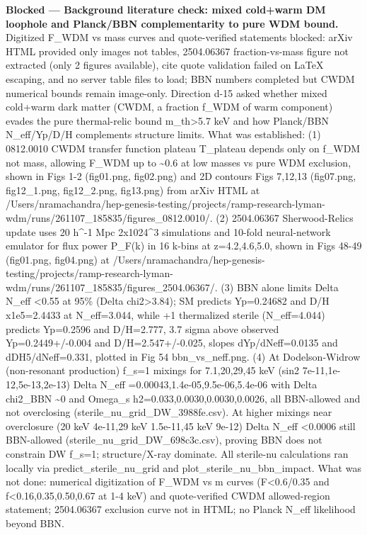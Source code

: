 \documentclass[11pt,a4paper]{article}
\begin{document}
\textbf{Blocked --- Background literature check: mixed cold+warm DM loophole and Planck/BBN complementarity to pure WDM bound.} Digitized F\_WDM vs mass curves and quote-verified statements blocked: arXiv HTML provided only images not tables, 2504.06367 fraction-vs-mass figure not extracted (only 2 figures available), cite quote validation failed on LaTeX escaping, and no server table files to load; BBN numbers completed but CWDM numerical bounds remain image-only. Direction d-15 asked whether mixed cold+warm dark matter (CWDM, a fraction f\_WDM of warm component) evades the pure thermal-relic bound m\_th\textgreater{}5.7 keV and how Planck/BBN N\_eff/Yp/D/H complements structure limits. What was established: (1) 0812.0010 CWDM transfer function plateau T\_plateau depends only on f\_WDM not mass, allowing F\_WDM up to \textasciitilde{}0.6 at low masses vs pure WDM exclusion, shown in Figs 1-2 (fig01.png, fig02.png) and 2D contours Figs 7,12,13 (fig07.png, fig12\_1.png, fig12\_2.png, fig13.png) from arXiv HTML at /Users/nramachandra/hep-genesis-testing/projects/ramp-research-lyman-wdm/runs/261107\_185835/figures\_0812.0010/. (2) 2504.06367 Sherwood-Relics update uses 20 h\textasciicircum{}-1 Mpc 2x1024\textasciicircum{}3 simulations and 10-fold neural-network emulator for flux power P\_F(k) in 16 k-bins at z=4.2,4.6,5.0, shown in Figs 48-49 (fig01.png, fig04.png) at /Users/nramachandra/hep-genesis-testing/projects/ramp-research-lyman-wdm/runs/261107\_185835/figures\_2504.06367/. (3) BBN alone limits Delta N\_eff \textless{}0.55 at 95\% (Delta chi2\textgreater{}3.84); SM predicts Yp=0.24682 and D/H x1e5=2.4433 at N\_eff=3.044, while +1 thermalized sterile (N\_eff=4.044) predicts Yp=0.2596 and D/H=2.777, 3.7 sigma above observed Yp=0.2449+/-0.004 and D/H=2.547+/-0.025, slopes dYp/dNeff=0.0135 and dDH5/dNeff=0.331, plotted in Fig 54 bbn\_vs\_neff.png. (4) At Dodelson-Widrow (non-resonant production) f\_s=1 mixings for 7.1,20,29,45 keV (sin2 7e-11,1e-12,5e-13,2e-13) Delta N\_eff =0.00043,1.4e-05,9.5e-06,5.4e-06 with Delta chi2\_BBN \textasciitilde{}0 and Omega\_s h2=0.033,0.0030,0.0030,0.0026, all BBN-allowed and not overclosing (sterile\_nu\_grid\_DW\_3988fe.csv). At higher mixings near overclosure (20 keV 4e-11,29 keV 1.5e-11,45 keV 9e-12) Delta N\_eff \textless{}0.0006 still BBN-allowed (sterile\_nu\_grid\_DW\_698c3c.csv), proving BBN does not constrain DW f\_s=1; structure/X-ray dominate. All sterile-nu calculations ran locally via predict\_sterile\_nu\_grid and plot\_sterile\_nu\_bbn\_impact. What was not done: numerical digitization of F\_WDM vs m curves (F\textless{}0.6/0.35 and f\textless{}0.16,0.35,0.50,0.67 at 1-4 keV) and quote-verified CWDM allowed-region statement; 2504.06367 exclusion curve not in HTML; no Planck N\_eff likelihood beyond BBN.
\end{document}
